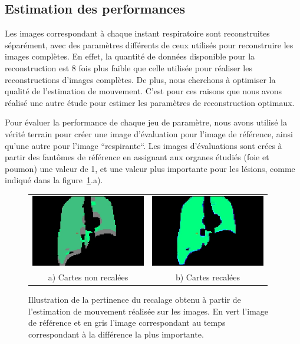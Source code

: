 \subsection{Estimation des performances}

Les images correspondant à chaque instant respiratoire sont reconstruites séparément, avec des paramètres différents de ceux utilisés pour reconstruire les images complètes. En effet, la quantité de données disponible pour la reconstruction est 8 fois plus faible que celle utilisée pour réaliser les reconstructions d'images complètes. De plus, nous cherchons à optimiser la qualité de l'estimation de mouvement. C'est pour ces raisons que nous avons réalisé une autre étude pour estimer les paramètres de reconstruction optimaux. 

Pour évaluer la performance de chaque jeu de paramètre, nous avons utilisé la vérité terrain pour créer une image d'évaluation pour l'image de référence, ainsi qu'une autre pour l'image ``respirante``. Les images d'évaluations sont crées à partir des fantômes de référence en assignant aux organes étudiés (foie et poumon) une valeur de 1, et une valeur plus importante pour les lésions, comme indiqué dans la figure~\ref{lab:perfsFctIterReg}.a). 

\begin{figure}
\centering
\begin{tabular}{c c}
	\includegraphics[width=5cm]{images/sansCorrection} & \includegraphics[width=5cm]{images/avecCorrection} \\
	a) Cartes non recalées				& b) Cartes recalées
\end{tabular}
\caption[Illustration du recalage obtenu]{Illustration de la pertinence du recalage obtenu à partir de l'estimation de mouvement réalisée sur les images. En vert l'image de référence et en gris l'image correspondant au temps correspondant à la différence la plus importante. }
\label{lab:perfsFctIterReg}
\end{figure}

